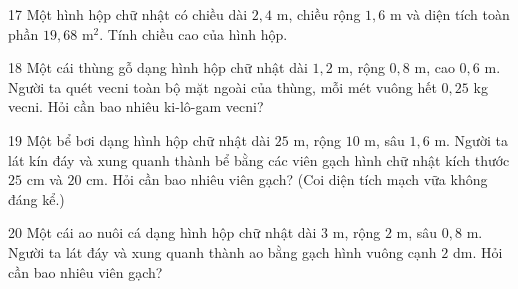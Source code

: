 \gap
\begin{probbox}{17}{\relax}
Một hình hộp chữ nhật có chiều dài $2{,}4$ m, chiều rộng $1{,}6$ m và diện tích toàn phần $19{,}68$ m$^2$. Tính chiều cao của hình hộp.
\end{probbox}
\gap
\begin{probbox}{18}{\relax}
Một cái thùng gỗ dạng hình hộp chữ nhật dài $1{,}2$ m, rộng $0{,}8$ m, cao $0{,}6$ m. Người ta quét vecni toàn bộ mặt ngoài của thùng, mỗi mét vuông hết $0{,}25$ kg vecni. Hỏi cần bao nhiêu ki-lô-gam vecni?
\end{probbox}
\gap
\begin{probbox}{19}{\relax}
Một bể bơi dạng hình hộp chữ nhật dài $25$ m, rộng $10$ m, sâu $1{,}6$ m. Người ta lát kín đáy và xung quanh thành bể bằng các viên gạch hình chữ nhật kích thước $25$ cm và $20$ cm. Hỏi cần bao nhiêu viên gạch? (Coi diện tích mạch vữa không đáng kể.)
\end{probbox}
\gap
\begin{probbox}{20}{\relax}
Một cái ao nuôi cá dạng hình hộp chữ nhật dài $3$ m, rộng $2$ m, sâu $0{,}8$ m. Người ta lát đáy và xung quanh thành ao bằng gạch hình vuông cạnh $2$ dm. Hỏi cần bao nhiêu viên gạch?
\end{probbox}
